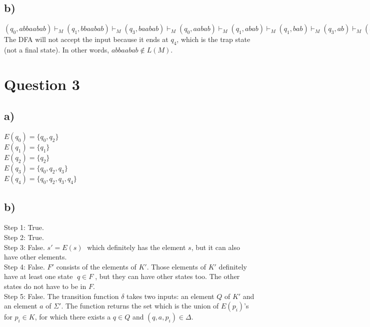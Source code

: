 \documentclass{article}
\begin{document}
\subsection*{b)}
$(q_0, abbaabab) \vdash_M (q_1, bbaabab) \vdash_M (q_3, baabab) \vdash_M (q_0, aabab) \vdash_M (q_1, abab) \vdash_M (q_1, bab) \vdash_M (q_3,ab) \vdash_M (q_4,b) \vdash_M (q_4,e)$\vspace{0.3cm}\\
The DFA will not accept the input because it ends at $q_4$, which is the trap state (not a final state). In other words, $abbaabab \notin L(M).$
\section*{Question 3}
\subsection*{a)}
$E(q_0) = \{q_0, q_2\}$\vspace{0.1cm}\\
$E(q_1) = \{q_1\}$\vspace{0.1cm}\\
$E(q_2) = \{q_2\}$\vspace{0.1cm}\\
$E(q_3) = \{q_0, q_2, q_3\}$\vspace{0.1cm}\\
$E(q_4) = \{q_0, q_2, q_3, q_4\}$
\subsection*{b)}
Step 1: True.\vspace{0.1cm}\\
Step 2: True.\vspace{0.1cm}\\
Step 3: False. $s' = E(s) \;$ which definitely has the element $s$, but it can also have other elements.\vspace{0.1cm}\\
Step 4: False. $F'$ consists of the elements of $K'$. Those elements of $K'$ definitely have at least one state $\; q \in F \;$, but they can have other states too. The other states do not have to be in $F$.\vspace{0.1cm}\\
Step 5: False. The transition function $\delta$ takes two inputs: an element $Q$ of $K'$ and an element $a$ of $\Sigma'$.  The function returns the set which is the union of $E(p_i)$'s for $p_i \in K$, for which there exists a $q \in Q$ and $(q,a,p_i) \in \Delta$. 
\end{document}
